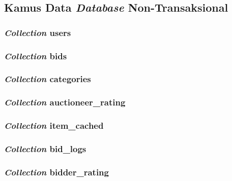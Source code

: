 
\subsection{Kamus Data \textit{Database} Non-Transaksional}
	
	\subsubsection{\textit{Collection} users}
	
	\subsubsection{\textit{Collection} bids}
	\subsubsection{\textit{Collection} categories}
	\subsubsection{\textit{Collection} auctioneer\_rating}
	\subsubsection{\textit{Collection} item\_cached}
	\subsubsection{\textit{Collection} bid\_logs}
	\subsubsection{\textit{Collection} bidder\_rating}
	

%   	
    